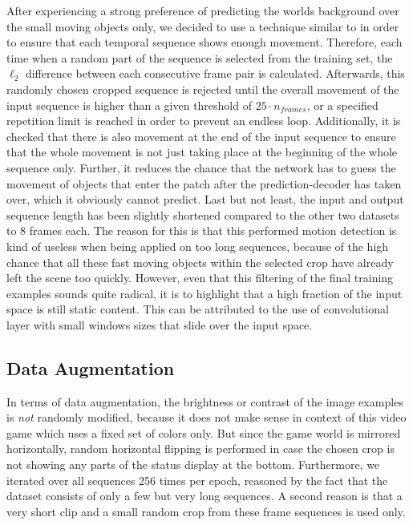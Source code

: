 After experiencing a strong preference of predicting the worlds background over the small moving objects only, we decided to use a technique similar to \parencite{deep_multiscale_video_pred} in order to ensure that each temporal sequence shows enough movement. Therefore, each time when a random part of the sequence is selected from the training set, the $\ell_2$ difference between each consecutive frame pair is calculated. Afterwards, this randomly chosen cropped sequence is rejected until the overall movement of the input sequence is higher than a given threshold of $25 \cdot n_{frames}$, or a specified repetition limit is reached in order to prevent an endless loop. Additionally, it is checked that there is also movement at the end of the input sequence to ensure that the whole movement is not just taking place at the beginning of the whole sequence only. Further, it reduces the chance that the network has to guess the movement of objects that enter the patch after the prediction-decoder has taken over, which it obviously cannot predict. Last but not least, the input and output sequence length has been slightly shortened compared to the other two datasets to \num{8} frames each. The reason for this is that this performed motion detection is kind of useless when being applied on too long sequences, because of the high chance that all these fast moving objects within the selected crop have already left the scene too quickly. However, even that this filtering of the final training examples sounds quite radical, it is to highlight that a high fraction of the input space is still static content. This can be attributed to the use of convolutional layer with small windows sizes that slide over the input space.

\subsection{Data Augmentation}

In terms of data augmentation, the brightness or contrast of the image examples is \textit{not} randomly modified, because it does not make sense in context of this video game which uses a fixed set of colors only. But since the game world is mirrored horizontally, random horizontal flipping is performed in case the chosen crop is not showing any parts of the status display at the bottom. Furthermore, we iterated over all sequences \num{256} times per epoch, reasoned by the fact that the dataset consists of only a few but very long sequences. A second reason is that a very short clip and a small random crop from these frame sequences is used only. 



